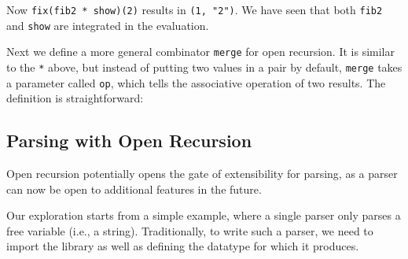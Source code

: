 Now \lstinline{fix(fib2 * show)(2)} results in \lstinline{(1, "2")}. We have seen that both \lstinline{fib2} and \lstinline{show} are integrated in the evaluation.

Next we define a more general combinator \lstinline{merge} for open recursion. It is similar to the \lstinline{*} above, but instead of putting two values in a pair by default, \lstinline{merge} takes a parameter called \lstinline{op}, which tells the associative operation of two results. The definition is straightforward:



\subsection{Parsing with Open Recursion}\label{subsec:parsingwithopen}

Open recursion potentially opens the gate of extensibility for
parsing, as a parser can now be open to additional features in the future.


Our exploration starts from a simple example, where a single parser only parses a free variable (i.e., a string). Traditionally, to write
such a parser, we need to import the library as
well as defining the datatype for which it produces.

